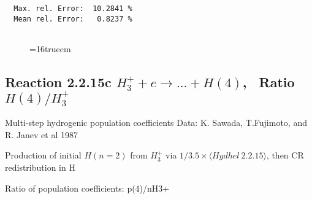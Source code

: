 \documentclass[12pt,dvipdfmx]{article}
\begin{document}
\begin{small}
\begin{verbatim}
  Max. rel. Error:  10.2841 %
  Mean rel. Error:   0.8237 %


\end{verbatim}\end{small}
\begin{figure} \label{2.2.15b}
\epsfxsize=16truecm
\end{figure}
\newpage


\subsection{
Reaction 2.2.15c $ H_3^+ + e \rightarrow ...+ H(4) $, \   Ratio $H(4)/H_3^+  $
}

 Multi-step hydrogenic population coefficients
 Data: K. Sawada, T.Fujimoto, \cite{kn:Sawada} and R. Janev et al 1987

 Production of initial $H(n=2)$ from $H_3^+$ via $1/3.5 \times \langle Hydhel~ 2.2.15\rangle$,
 then CR redistribution in H

 Ratio of population coefficients: p(4)/nH3+
\end{document}
